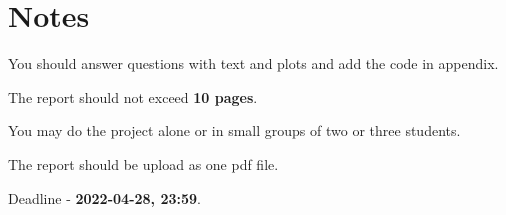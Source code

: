 \documentclass[12pt]{article}
\begin{document}
\section*{Notes}

You should answer questions with text and plots and add the code in appendix. 

The report should not exceed \textbf{10 pages}.

You may do the project alone or in small groups of two or three students. 

The report should be upload as one pdf file. 

Deadline - \textbf{2022-04-28, 23:59}. 
\end{document}
